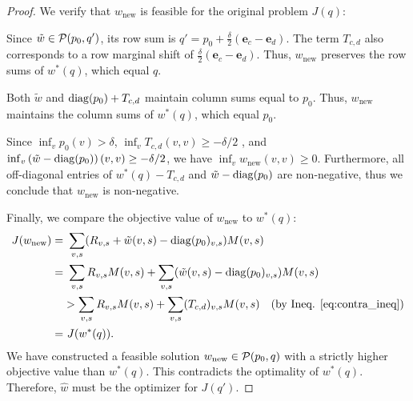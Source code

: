 \begin{proof}
We verify that $w_{\text{new}}$ is feasible for the original problem $J(q)$:

Since $\tilde{w} \in \mathcal{P}(p_0, q')$, its row sum is $q' = p_0 + \frac{\delta}{2}(\mathbf{e}_c - \mathbf{e}_d)$. The term $T_{c,d}$ also corresponds to a row marginal shift of $\frac{\delta}{2}(\mathbf{e}_c - \mathbf{e}_d)$. Thus, $w_{\text{new}}$ preserves the row sums of $w^*(q)$, which equal $q$.
 
Both $\tilde{w}$ and $\mathrm{diag}(p_0) + T_{c,d}$ maintain column sums equal to $p_0$. Thus, $w_{\text{new}}$ maintains the column sums of $w^*(q)$, which equal $p_0$.
 
Since $\inf_{v} p_0(v) > \delta$, $\inf_{v} T_{c,d}(v,v) \geq -\delta/2$ , and $\inf_{v} \left(\tilde{w} - \mathrm{diag}(p_0)\right)(v,v) \geq -\delta/2$, we have $\inf_{v} w_{\text{new}}(v,v) \geq 0$. Furthermore, all off-diagonal entries of $w^*(q) - T_{c,d}$ and $\tilde{w} - \mathrm{diag}(p_0)$ are non-negative, thus we conclude that $w_{\text{new}}$ is non-negative.


Finally, we compare the objective value of $w_{\text{new}}$ to $w^*(q)$:
\begin{align*}
J(w_{\text{new}}) = &~ \sum_{v,s} (R_{v,s} + \tilde{w}(v,s) - \mathrm{diag}(p_0)_{v,s}) M(v,s) \\
= &~ \sum_{v,s} R_{v,s} M(v,s) + \sum_{v,s} (\tilde{w}(v,s) - \mathrm{diag}(p_0)_{v,s}) M(v,s) \\
&> \sum_{v,s} R_{v,s} M(v,s) + \sum_{v,s} (T_{c,d})_{v,s} M(v,s) \quad \text{(by Ineq. \ref{eq:contra_ineq})} \\
= &~ J(w^*(q)).
\end{align*}
We have constructed a feasible solution $w_{\text{new}} \in \mathcal{P}(p_0, q)$ with a strictly higher objective value than $w^*(q)$. This contradicts the optimality of $w^*(q)$. Therefore, $\hat{w}$ must be the optimizer for $J(q')$.
\end{proof}

